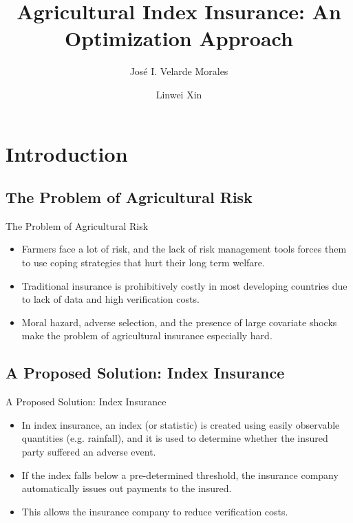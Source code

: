 \documentclass{beamer}
\title[Agricultural Index Insurance]{Agricultural Index Insurance: An Optimization Approach}
\author{José I. Velarde Morales \and Linwei Xin}
\institute[Chicago Booth]
{

  University of Chicago\\
  Booth School of Business

}
\begin{document}
\frame{\titlepage}
\section{Introduction}

\subsection{The Problem of Agricultural Risk}
\begin{frame}{The Problem of Agricultural Risk}
\begin{itemize}
    \setlength\itemsep{2em}
    \item Farmers face a lot of risk, and the lack of risk management tools forces them to use coping strategies that hurt their long term welfare.
   
    \item Traditional insurance is prohibitively costly in most developing countries due to lack of data and high verification costs.

    \item Moral hazard, adverse selection, and the presence of large covariate shocks make the problem of agricultural insurance especially hard. 
\end{itemize}
\end{frame}

\subsection{A Proposed Solution: Index Insurance}
\begin{frame}{A Proposed Solution: Index Insurance}
\begin{itemize}
   \setlength\itemsep{1.5em}
    \item In index insurance, an index (or statistic) is created using easily observable quantities (e.g. rainfall), and it is used to determine whether the insured party suffered an adverse event. 
    \item If the index falls below a pre-determined threshold, the insurance company automatically issues out payments to the insured. 
    \item This allows the insurance company to reduce verification costs.
\end{itemize}
\end{frame}
\end{document}
